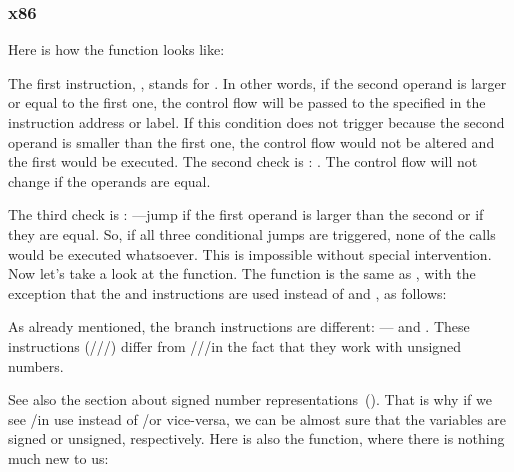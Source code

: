 \subsubsection{x86}


Here is how the  function looks like:




The first instruction, \JLE, stands for . 
In other words, if the second operand is 
larger or equal to the first one, the control flow will be passed to the specified in the instruction address or label.
If this condition does not trigger because the second operand is smaller than the first one, the control flow would not be altered and the first \printf would be executed.
The second check is \JNE: .
The control flow will not change if the operands are equal.

The third check is \JGE: ---jump if the first operand is larger than 
the second or if they are equal.
So, if all three conditional jumps are triggered, none of the \printf calls would be executed whatsoever. 
This is impossible without special intervention.
Now let's take a look at the  function.
The  function is the same as , with the exception that the \JBE and \JAE instructions
are used instead of \JLE and \JGE, as follows:




As already mentioned, the branch instructions are different:
\JBE--- and \JAE\EMDASH{}.
These instructions (\JA/\JAE/\JB/\JBE) differ from \JG/\JGE/\JL/\JLE in the fact that they work with unsigned numbers.


See also the section about signed number representations~().
That is why if we see \JG/\JL in use instead of \JA/\JB or vice-versa, 
we can be almost sure that the variables are signed or unsigned, respectively.
Here is also the \main function, where there is nothing much new to us:

